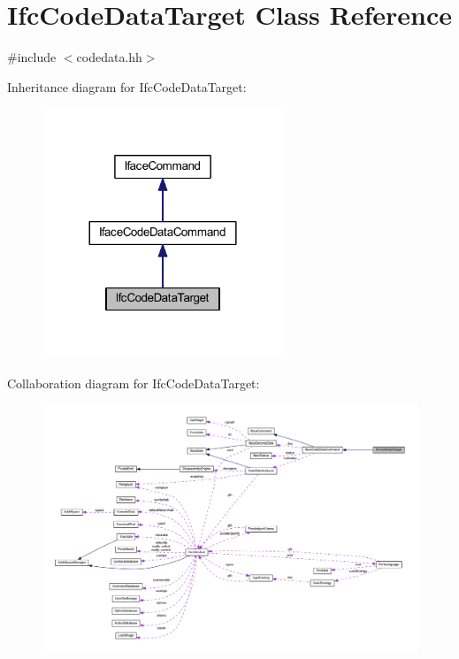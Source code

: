 \hypertarget{class_ifc_code_data_target}{}\section{Ifc\+Code\+Data\+Target Class Reference}
\label{class_ifc_code_data_target}


{\ttfamily \#include $<$codedata.\+hh$>$}



Inheritance diagram for Ifc\+Code\+Data\+Target\+:
\nopagebreak
\begin{figure}[H]
\begin{center}
\leavevmode
\includegraphics[width=204pt]{class_ifc_code_data_target__inherit__graph}
\end{center}
\end{figure}


Collaboration diagram for Ifc\+Code\+Data\+Target\+:
\nopagebreak
\begin{figure}[H]
\begin{center}
\leavevmode
\includegraphics[width=350pt]{class_ifc_code_data_target__coll__graph}
\end{center}
\end{figure}
